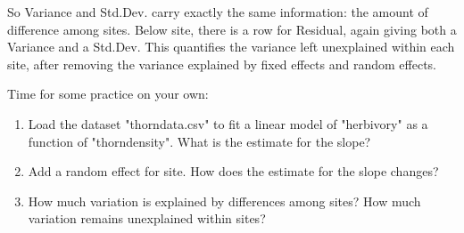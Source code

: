 \documentclass[12pt,a4paper]{scrartcl}\usepackage[]{graphicx}\usepackage[]{color}
\begin{document}
So Variance and Std.Dev. carry exactly the same information: the amount of difference among sites.
Below site, there is a row for Residual, again giving both a Variance and a Std.Dev. This quantifies the variance left unexplained within each site, after removing the variance explained by fixed effects and random effects.


Time for some practice on your own:

\begin{Exercise}[difficulty=1, title={A mixed model for the thorn data set}]
\begin{enumerate}
  \item Load the dataset "thorndata.csv" to fit a linear model of "herbivory" as a function of "thorndensity". What is the estimate for the slope?\\
  \item Add a random effect for site. How does the estimate for the slope changes?\\
  \item How much variation is explained by differences among sites? How much variation remains unexplained within sites?
\end{enumerate}
\end{Exercise}
\end{document}
